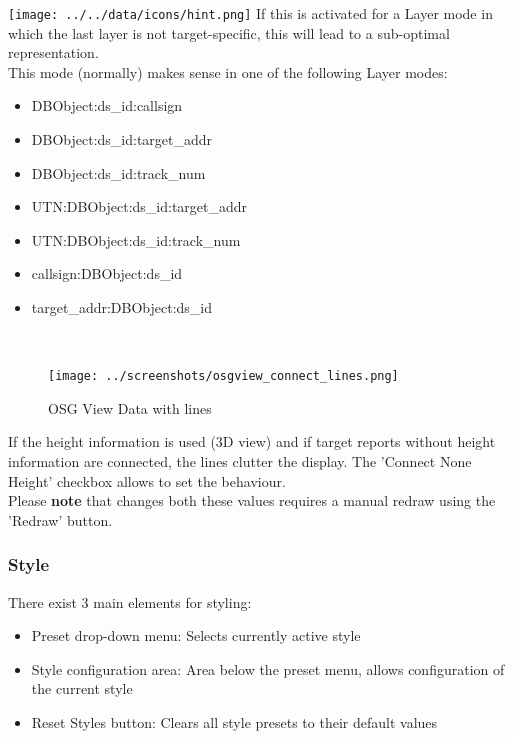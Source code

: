\texttt{[image: ../../data/icons/hint.png]} If this is activated for a Layer mode in which the last layer is not target-specific, this will lead to a sub-optimal representation. \\

This mode (normally) makes sense in one of the following Layer modes:

\begin{itemize}
 \item DBObject:ds\_id:callsign
 \item DBObject:ds\_id:target\_addr
 \item DBObject:ds\_id:track\_num
 \item UTN:DBObject:ds\_id:target\_addr
 \item UTN:DBObject:ds\_id:track\_num
 \item callsign:DBObject:ds\_id 
 \item target\_addr:DBObject:ds\_id
\end{itemize}
\  \\

\begin{figure}[H]
    \hspace*{-2.5cm}
    \texttt{[image: ../screenshots/osgview\_connect\_lines.png]}
  \caption{OSG View Data with lines}
\end{figure}

If the height information is used (3D view) and if target reports without height information are connected, the lines clutter the display. The 'Connect None Height' checkbox allows to set the behaviour. \\

Please \textbf{note} that changes both these values requires a manual redraw using the 'Redraw' button.

\subsubsection{Style}
\label{sec:style}

There exist 3 main elements for styling:
\begin{itemize}
 \item Preset drop-down menu: Selects currently active style
 \item Style configuration area: Area below the preset menu, allows configuration of the current style
 \item Reset Styles button: Clears all style presets to their default values
\end{itemize}
\  \\

